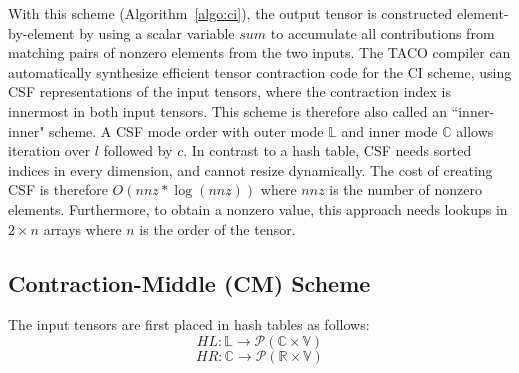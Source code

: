 With this scheme (Algorithm~\ref{algo:ci}), the output tensor is constructed element-by-element by using a scalar variable $sum$ to accumulate all contributions from matching pairs of nonzero elements from the two inputs.
The TACO compiler \cite{kjolstad-oopsla17} can automatically synthesize efficient tensor contraction code for the CI scheme, using CSF representations of the input tensors, where the contraction index is innermost in both input tensors. This scheme is therefore also called an ``inner-inner" scheme. 
A CSF mode order with outer mode $\mathbb{L}$ and inner mode $\mathbb{C}$ allows iteration over $l$ followed by $c$.
In contrast to a hash table, CSF needs sorted indices in every dimension, and cannot resize dynamically. The cost of creating CSF is therefore $O(\mathit{nnz}\ast \log(\mathit{nnz}))$ where $\mathit{nnz}$ is the number of nonzero elements.
Furthermore, to obtain a nonzero value, this approach needs lookups in $2\times n$ arrays where $n$ is the order of the tensor. 


\subsection{Contraction-Middle (CM) Scheme} 
\label{subsec:contraction-middle}
The input tensors are first placed in hash tables as follows:
$$\mathit{HL}: \mathbb{L} \rightarrow \mathcal{P}(\mathbb{C} \times \mathbb{V})$$
$$\mathit{HR}: \mathbb{C} \rightarrow \mathcal{P}(\mathbb{R} \times \mathbb{V})$$

